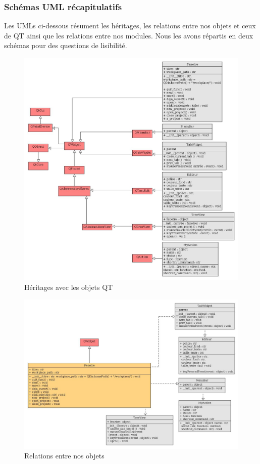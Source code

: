 \documentclass[a4paper,12pt]{article}
\begin{document}
		\subsubsection*{Schémas UML récapitulatifs}
		
			Les UMLs ci-dessous résument les héritages, les relations entre nos objets et ceux de QT ainsi que les relations entre nos modules. Nous les avons répartis en deux schémas pour des questions de lisibilité.
			
			\begin{figure}[h!]
			\begin{center}
				\includegraphics[scale=0.35]{images/uml_module_gui_heritage}
				\caption{Héritages avec les objets QT}
			\end{center}
			\end{figure}
			
			\begin{figure}[h!]
				\includegraphics[scale=0.4]{images/uml_module_gui_relations}
				\caption{Relations entre nos objets}
			\end{figure}
			
\end{document}
